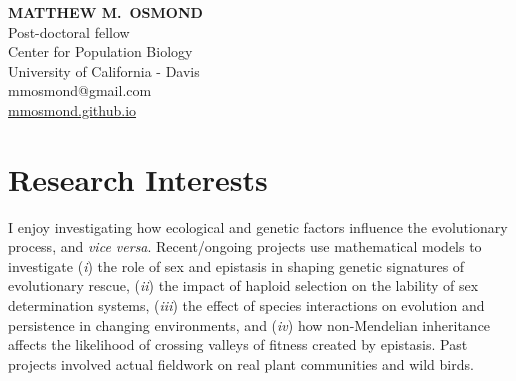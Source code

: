 \documentclass[12pt]{article}
\begin{document}
\thispagestyle{empty} 
\pagestyle{fancy}

{\raggedleft
\noindent\Large{\textbf{MATTHEW M.\ OSMOND}}\\
\large Post-doctoral fellow\\
\large Center for Population Biology\\
\large University of California - Davis \\
\large mmosmond@gmail.com\\
\href{https://mmosmond.github.io}{mmosmond.github.io}\\
}



\section*{Research Interests}

I enjoy investigating how ecological and genetic factors influence the evolutionary process, and \textit{vice versa}.
Recent/ongoing projects use mathematical models to investigate (\textit{i}) the role of sex and epistasis in shaping genetic signatures of evolutionary rescue, (\textit{ii}) the impact of haploid selection on the lability of sex determination systems, (\textit{iii}) the effect of species interactions on evolution and persistence in changing environments, and (\textit{iv}) how non-Mendelian inheritance affects the likelihood of crossing valleys of fitness created by epistasis.
Past projects involved actual fieldwork on real plant communities and wild birds.
\end{document}
